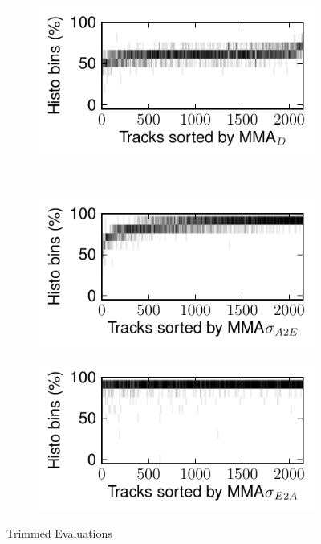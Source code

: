 \documentclass{article}
\begin{document}
\begin{figure}
      \begin{subfigure}[b]{0.25\textwidth}
              \includegraphics[width=\textwidth]{plots/histo-D-trim.pdf}
              \caption{}
              \label{fig:histo-D-trim}
      \end{subfigure}%
      ~ 
      \begin{subfigure}[b]{0.25\textwidth}
              \includegraphics[width=\textwidth]{plots/histo-DevA2E-trim.pdf}
              \caption{}
              \label{fig:histo-DevA2E-trim}
      \end{subfigure}%
       
      \begin{subfigure}[b]{0.25\textwidth}
              \includegraphics[width=\textwidth]{plots/histo-DevE2A-trim.pdf}
              \caption{}
              \label{fig:histo-DevE2A-trim}
      \end{subfigure}%

      \caption{Trimmed Evaluations}\label{fig:machine-eval-trim}
\end{figure}
\end{document}
